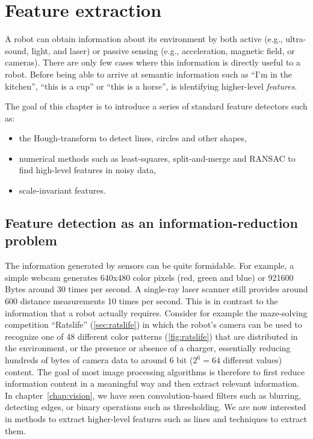 \chapter{Feature extraction}\label{chap:feature_extraction}

A robot can obtain information about its environment by both active (e.g., ultra-sound, light, and laser) or passive sensing (e.g., acceleration, magnetic field, or cameras). There are only few cases where this information is directly useful to a robot. Before being able to arrive at semantic information such as ``I'm in the kitchen'', ``this is a cup'' or ``this is a horse'', is identifying higher-level \textsl{features}.

The goal of this chapter is to introduce a series of standard feature detectors such as:

\begin{itemize}
    \item the Hough-transform to detect lines, circles and other shapes,
    \item numerical methods such as least-squares, split-and-merge and RANSAC to find high-level features in noisy data,
    \item scale-invariant features.
\end{itemize}

\section{Feature detection as an information-reduction problem}
The information generated by sensors can be quite formidable. For example, a simple webcam generates 640x480 color pixels (red, green and blue) or 921600 Bytes around 30 times per second. A single-ray laser scanner still provides around 600 distance measurements 10 times per second. This is in contrast to the information that a robot actually requires. Consider for example the maze-solving competition ``Ratslife'' (\cref{sec:ratslife}) in which the robot's camera can be used to recognize one of 48 different color patterns (\cref{fig:ratslife}) that are distributed in the environment, or the presence or absence of a charger, essentially reducing hundreds of bytes of camera data to around 6 bit ($2^6=64$ different values) content. The goal of most image processing algorithms is therefore to first reduce information content in a meaningful way and then extract relevant information. In chapter~\ref{chap:vision}, we have seen convolution-based filters such as blurring, detecting edges, or binary operations such as thresholding. We are now interested in methods to extract higher-level features such as lines and techniques to extract them.

